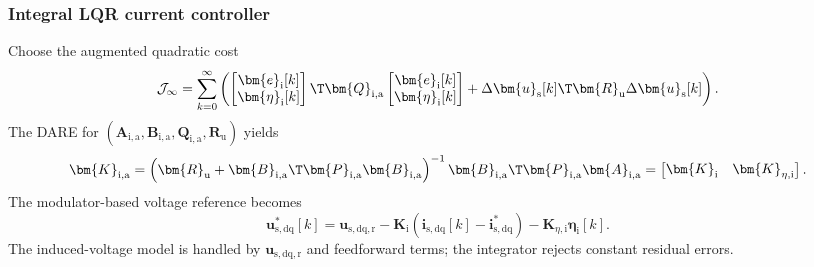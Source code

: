 \begin{frame}
	\frametitle{Integral LQR current controller}
	Choose the augmented quadratic cost
	\begin{equation*}
		\mathcal{J}_\infty
		=\sum_{k=0}^{\infty}
		\left(
		\begin{bmatrix}\bm{e}_{\mathrm{i}}[k]\\\bm{\eta}_{\mathrm{i}}[k]\end{bmatrix}\T
		\bm{Q}_{\mathrm{i},\mathrm{a}}
		\begin{bmatrix}\bm{e}_{\mathrm{i}}[k]\\\bm{\eta}_{\mathrm{i}}[k]\end{bmatrix}
		+\Delta\bm{u}_{\mathrm{s}}[k]\T\bm{R}_{\mathrm{u}}\Delta\bm{u}_{\mathrm{s}}[k]
		\right).
	\end{equation*}\pause%
	The DARE for $(\bm{A}_{\mathrm{i},\mathrm{a}},\bm{B}_{\mathrm{i},\mathrm{a}},\bm{Q}_{\mathrm{i},\mathrm{a}},\bm{R}_{\mathrm{u}})$ yields
	\begin{equation*}
		\bm{K}_{\mathrm{i},\mathrm{a}}
		=\left(\bm{R}_{\mathrm{u}}+\bm{B}_{\mathrm{i},\mathrm{a}}\T\bm{P}_{\mathrm{i},\mathrm{a}}\bm{B}_{\mathrm{i},\mathrm{a}}\right)^{-1}
		\bm{B}_{\mathrm{i},\mathrm{a}}\T\bm{P}_{\mathrm{i},\mathrm{a}}\bm{A}_{\mathrm{i},\mathrm{a}}
		=\begin{bmatrix}\bm{K}_{\mathrm{i}}&\bm{K}_{\eta,\mathrm{i}}\end{bmatrix}.
	\end{equation*}\pause%
	The modulator-based voltage reference becomes
	\begin{equation*}
		\boxed{\bm{u}_{\mathrm{s},\mathrm{dq}}^*[k]
			=\bm{u}_{\mathrm{s},\mathrm{dq},\mathrm{r}}
			-\bm{K}_{\mathrm{i}}\left(\bm{i}_{\mathrm{s},\mathrm{dq}}[k]-\bm{i}_{\mathrm{s},\mathrm{dq}}^*\right)
			-\bm{K}_{\eta,\mathrm{i}}\bm{\eta}_{\mathrm{i}}[k].}
	\end{equation*}\pause%
	The induced-voltage model is handled by $\bm{u}_{\mathrm{s},\mathrm{dq},\mathrm{r}}$ and feedforward terms; the integrator rejects constant residual errors.
\end{frame}


